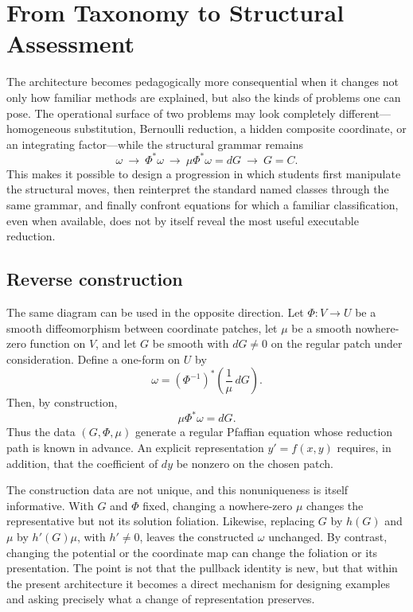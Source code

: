 \documentclass[11pt]{article}
\theoremstyle{definition}
\begin{document}
\section{From Taxonomy to Structural Assessment}

The architecture becomes pedagogically more consequential when it changes not only how familiar methods are explained, but also the kinds of problems one can pose. The operational surface of two problems may look completely different---homogeneous substitution, Bernoulli reduction, a hidden composite coordinate, or an integrating factor---while the structural grammar remains
\[
\boxed{\omega\ \longrightarrow\ \Phi^*\omega\ \longrightarrow\ \mu\Phi^*\omega=dG\ \longrightarrow\ G=C.}
\]
This makes it possible to design a progression in which students first manipulate the structural moves, then reinterpret the standard named classes through the same grammar, and finally confront equations for which a familiar classification, even when available, does not by itself reveal the most useful executable reduction.

\subsection*{Reverse construction}
The same diagram can be used in the opposite direction. Let \(\Phi:V\to U\) be a smooth diffeomorphism between coordinate patches, let \(\mu\) be a smooth nowhere-zero function on \(V\), and let \(G\) be smooth with \(dG\neq0\) on the regular patch under consideration. Define a one-form on \(U\) by
\[
\omega=(\Phi^{-1})^*\!\left(\frac{1}{\mu}\,dG\right).
\]
Then, by construction,
\[
\mu\Phi^*\omega=dG.
\]
Thus the data \((G,\Phi,\mu)\) generate a regular Pfaffian equation whose reduction path is known in advance. An explicit representation \(y'=f(x,y)\) requires, in addition, that the coefficient of \(dy\) be nonzero on the chosen patch.

The construction data are not unique, and this nonuniqueness is itself informative. With \(G\) and \(\Phi\) fixed, changing a nowhere-zero \(\mu\) changes the representative but not its solution foliation. Likewise, replacing \(G\) by \(h(G)\) and \(\mu\) by \(h'(G)\mu\), with \(h'\neq0\), leaves the constructed \(\omega\) unchanged. By contrast, changing the potential or the coordinate map can change the foliation or its presentation. The point is not that the pullback identity is new, but that within the present architecture it becomes a direct mechanism for designing examples and asking precisely what a change of representation preserves.
\end{document}
